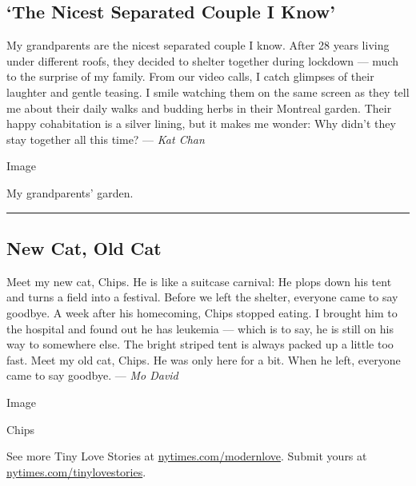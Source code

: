 \hypertarget{the-nicest-separated-couple-i-know}{%
\subsection{`The Nicest Separated Couple I
Know'}\label{the-nicest-separated-couple-i-know}}

My grandparents are the nicest separated couple I know. After 28 years
living under different roofs, they decided to shelter together during
lockdown --- much to the surprise of my family. From our video calls, I
catch glimpses of their laughter and gentle teasing. I smile watching
them on the same screen as they tell me about their daily walks and
budding herbs in their Montreal garden. Their happy cohabitation is a
silver lining, but it makes me wonder: Why didn't they stay together all
this time? --- \emph{Kat Chan}

Image

My grandparents' garden.

\begin{center}\rule{0.5\linewidth}{\linethickness}\end{center}

\hypertarget{new-cat-old-cat}{%
\subsection{New Cat, Old Cat}\label{new-cat-old-cat}}

Meet my new cat, Chips. He is like a suitcase carnival: He plops down
his tent and turns a field into a festival. Before we left the shelter,
everyone came to say goodbye. A week after his homecoming, Chips stopped
eating. I brought him to the hospital and found out he has leukemia ---
which is to say, he is still on his way to somewhere else. The bright
striped tent is always packed up a little too fast. Meet my old cat,
Chips. He was only here for a bit. When he left, everyone came to say
goodbye. --- \emph{Mo David}

Image

Chips

See more Tiny Love Stories at
\href{https://www.nytimes.com/column/modern-love}{nytimes.com/modernlove}.
Submit yours at
\href{http://nytimes.com/tinylovestories}{nytimes.com/tinylovestories}.

